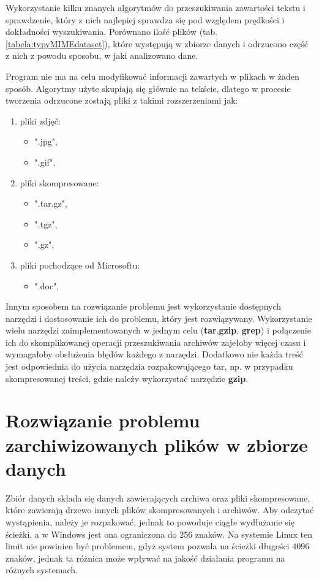 Wykorzystanie kilku znanych algorytmów do przeszukiwania zawartości
tekstu i sprawdzenie, który z nich najlepiej sprawdza się pod względem prędkości
i dokładności wyszukiwania. Porównano ilość plików (tab. \ref{tabela:typyMIMEdataset}),
które występują w zbiorze danych i odrzucono część z nich z powodu sposobu, w jaki
analizowano dane.

Program nie ma na celu modyfikować informacji zawartych w plikach w żaden sposób.
Algorytmy użyte skupiają się głównie na tekście, dlatego w procesie tworzenia 
odrzucone zostają pliki z takimi rozszerzeniami jak:

\begin{enumerate}
  \item pliki zdjęć:
  \begin{itemize}
    \item ".jpg",  
    \item ".gif",
  \end{itemize}
  \item pliki skompresowane:
  \begin{itemize}
    \item ".tar.gz",
    \item ".tgz",
    \item ".gz",
  \end{itemize}
  \item pliki pochodzące od Microsoftu:
  \begin{itemize}
    \item ".doc", 
  \end{itemize}
\end{enumerate}

Innym sposobem na rozwiązanie problemu jest wykorzystanie dostępnych narzędzi i
dostosowanie ich do problemu, który jest rozwiązywany. Wykorzystanie wielu narzędzi
zaimplementowanych w jednym celu (\textbf{tar},\textbf{gzip}, \textbf{grep}) i połączenie ich do 
skomplikowanej operacji przeszukiwania archiwów zajełoby więcej czasu
i wymagałoby obsłużenia błędów każdego z narzędzi. Dodatkowo nie każda treść
jest odpowiednia do użycia narzędzia rozpakowującego tar, np. w przypadku 
skompresowanej treści, gdzie należy wykorzystać narzędzie \textbf{gzip}.

\section{Rozwiązanie problemu zarchiwizowanych plików w zbiorze danych}

Zbiór danych składa się danych zawierających archiwa oraz pliki skompresowane,
które zawierają drzewo innych plików skompresowanych i archiwów.
Aby odczytać wystąpienia, należy je rozpakować, jednak to powoduje ciągłe 
wydłużanie się ścieżki, a w Windows jest ona ograniczona do 256 znaków. Na 
systemie Linux ten limit nie powinien być problemem, gdyż system pozwala na 
ścieżki długości 4096 znaków, jednak ta różnica może wpływać na jakość działania
programu na różnych systemach.

